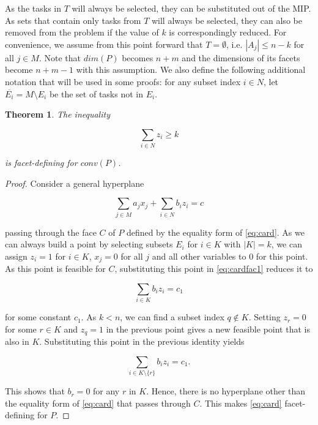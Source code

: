 \documentclass[12pt]{article}
\renewcommand{\v}[1]{\overline{#1}}
\newtheorem{thm}{Theorem}
\begin{document}
As the tasks in $T$ will always be selected, they can be substituted out of the MIP. As sets that contain only tasks from $T$ will always be selected, they can also be removed from the problem if the value of $k$ is correspondingly reduced. For convenience, we assume from this point forward that $T = \emptyset$, i.e. $|A_j| \leq n-k$ for all $j \in M$. Note that $dim(P)$ becomes $n+m$ and the dimensions of its facets become $n+m-1$ with this assumption. We also define the following additional notation that will be used in some proofs: for any subset index $i \in N$, let $\v{E_i} = M \setminus E_i$ be the set of tasks not in $E_i$.\\

\begin{thm} \label{thm:cardfac}
The inequality

\begin{equation} \label{eq:card}
\sum_{i \in N} z_i \geq k
\end{equation}

is facet-defining for $conv(P)$.
\end{thm}

\begin{proof}
Consider a general hyperplane

\begin{equation} \label{eq:cardfac1}
\sum_{j \in M} a_j x_j + \sum_{i \in N} b_i z_i = c
\end{equation}

passing through the face $C$ of $P$ defined by the equality form of \eqref{eq:card}. As we can always build a point by selecting subsets $E_i$ for $i \in K$ with $|K| = k$, we can assign $z_i = 1$ for $i \in K$, $x_j = 0$ for all $j$ and all other variables to $0$ for this point. As this point is feasible for $C$, substituting this point in \eqref{eq:cardfac1} reduces it to

\[ \sum_{i \in K} b_i z_i = c_1\]

for some constant $c_1$. As $k < n$, we can find a subset index $q \notin K$. Setting $z_r = 0$ for some $r \in K$ and $z_q = 1$ in the previous point gives a new feasible point that is also in $K$. Substituting this point in the previous identity yields

\[ \sum_{i \in K \setminus \{r\}} b_i z_i = c_1.\]

This shows that $b_r = 0$ for any $r$ in $K$. Hence, there is no hyperplane other than the equality form of \eqref{eq:card} that passes through $C$. This makes \eqref{eq:card} facet-defining for $P$.
\end{proof}
\end{document}
